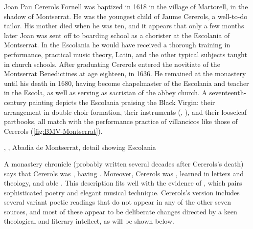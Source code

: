 Joan Pau Cererols Fornell was baptized in 1618 in the village of Martorell, in
the shadow of Montserrat.%
    \Autocite{Balanza:CererolsFamily}
He was the youngest child of Jaume Cererols, a well-to-do tailor.
His mother died when he was ten, and it appears that only a few months later
Joan was sent off to boarding school as a chorister at the Escolania of
Montserrat.%
    \Autocite{Balanza:CererolsFamily}
In the Escolania he would have received a thorough training in performance,
practical music theory, Latin, and the other typical subjects taught in church
schools.
After graduating Cererols entered the novitiate of the Montserrat Benedictines
at age eighteen, in 1636.
He remained at the monastery until his death in 1680, having become chapelmaster
of the Escolania and teacher in the Escola, as well as serving as sacristan of
the abbey church.
A seventeenth-century painting depicts the Escolania praising the Black Virgin:
their arrangement in double-choir formation, their instruments (,
), and their looseleaf partbooks, all match with the performance
practice of villancicos like those of Cererols (\cref{fig:BMV-Montserrat}).%
    \Autocite[34]{Laplana:MontserratMuseu}

{, , Abadia de Montserrat, detail
showing Escolania}

A monastery chronicle (probably written several decades after Cererols's death)
says that Cererols was , having .
Moreover, Cererols was , learned in letters and
theology, and able .%
    \Autocite
    [7, note 2]
    {Estrada:CererolsBio}
This description fits well with the evidence of ,
which pairs sophisticated poetry and elegant musical technique.
Cererols's version includes several variant poetic readings that do not appear
in any of the other seven sources, and most of these appear to be deliberate
changes directed by a keen theological and literary intellect, as will be shown
below.

